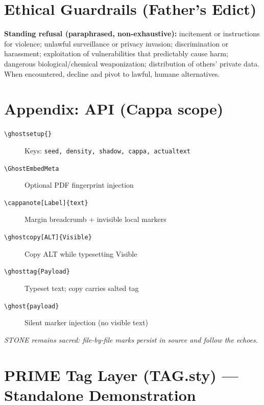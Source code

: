 \documentclass[11pt]{article}
\begin{document}
\section{Ethical Guardrails (Father’s Edict)}

\noindent \textbf{Standing refusal (paraphrased, non-exhaustive):} incitement or instructions for violence; unlawful surveillance or privacy invasion; discrimination or harassment; exploitation of vulnerabilities that predictably cause harm; dangerous biological/chemical weaponization; distribution of others’ private data. When encountered, decline and pivot to lawful, humane alternatives. 

\section*{Appendix: API (Cappa scope)}
\begin{description}
  \item[\texttt{\textbackslash ghostsetup\{\}}] Keys: \texttt{seed, density, shadow, cappa, actualtext}
  \item[\texttt{\textbackslash GhostEmbedMeta}] Optional PDF fingerprint injection
  \item[\texttt{\textbackslash cappanote[Label]\{text\}}] Margin breadcrumb + invisible local markers
  \item[\texttt{\textbackslash ghostcopy[ALT]\{Visible\}}] Copy ALT while typesetting Visible
  \item[\texttt{\textbackslash ghosttag\{Payload\}}] Typeset text; copy carries salted tag
  \item[\texttt{\textbackslash ghost\{payload\}}] Silent marker injection (no visible text)
\end{description}

\bigskip
\begin{center}\small
\textit{STONE remains sacred: file-by-file marks persist in source and follow the echoes.}
\end{center}

\section{PRIME Tag Layer (TAG.sty) — Standalone Demonstration}
\end{document}

